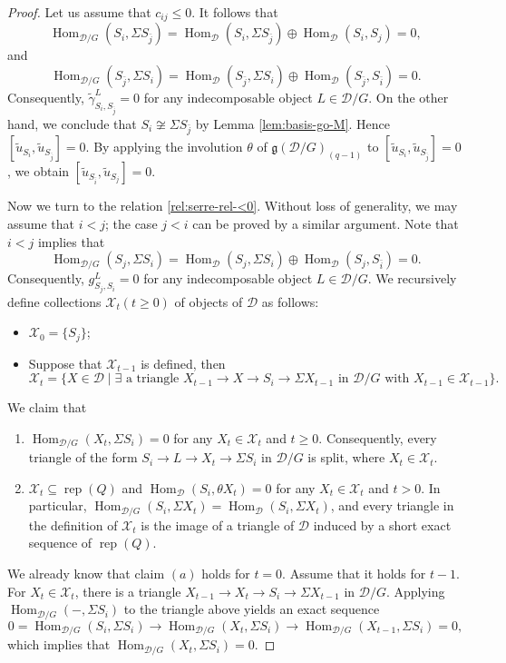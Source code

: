 \documentclass[12pt,reqno]{amsart}
\numberwithin{equation}{section}
\newcommand{\rep}{\operatorname{rep}\nolimits}
\newcommand{\Hom}{\operatorname{Hom}\nolimits}
\begin{document}
	\begin{proof}
		Let us assume that $c_{ij}\leq 0$. It follows that
		\[
		\Hom_{\mathcal{D}/G}(S_i,\Sigma S_{\bar{j}})=\Hom_{\mathcal{D}}(S_i,\Sigma S_{\bar{j}})\oplus \Hom_{\mathcal{D}}(S_i,S_j)=0,
		\]
		and 
		\[
		\Hom_{\mathcal{D}/G}(S_{\bar{j}},\Sigma S_{i})=\Hom_{\mathcal{D}}(S_{\bar{j}},\Sigma S_{i})\oplus \Hom_{\mathcal{D}}(S_{\bar{j}},S_{\bar{i}})=0.
		\]
		Consequently, $\tilde{\gamma}_{S_i,S_{\bar{j}}}^L=0$ for any indecomposable object $L\in \mathcal{D}/G$. On the other hand, we conclude that $S_i\not\cong \Sigma S_{\bar{j}}$ by Lemma \ref{lem:basis-go-M}. Hence $[\tilde{u}_{S_i},\tilde{u}_{S_{\bar{j}}}]=0$. By applying the involution $\theta$ of $\mathfrak{g}(\mathcal{D}/G)_{(q-1)}$ to $[\tilde{u}_{S_i},\tilde{u}_{S_{\bar{j}}}]=0$, we obtain $[\tilde{u}_{S_{\bar{i}}},\tilde{u}_{S_j}]=0$. 
		
		Now we turn to the relation \eqref{rel:serre-rel-<0}. Without loss of generality, we may assume that $i<j$; the case $j<i$ can be proved by a similar argument. Note that $i<j$ implies that \[\Hom_{\mathcal{D}/G}(S_j,\Sigma S_i)=\Hom_{\mathcal{D}}(S_j,\Sigma S_i)\oplus \Hom_{\mathcal{D}}(S_j,S_{\bar{i}})=0.\]
		Consequently, $g_{S_j,S_i}^L=0$ for any indecomposable object $L\in \mathcal{D}/G$. We recursively define collections $\mathcal{X}_t(t\geq 0)$ of objects of $\mathcal{D}$ as follows:
		\begin{itemize}
			\item $\mathcal{X}_0=\{S_j\}$;
			\item Suppose that $\mathcal{X}_{t-1}$ is defined, then 
			\[
			\mathcal{X}_t=\{X\in \mathcal{D}\mid \text{$\exists$ a triangle $X_{t-1}\rightarrow X\rightarrow S_i\rightarrow \Sigma X_{t-1}$ in $\mathcal{D}/G$ with $X_{t-1}\in \mathcal{X}_{t-1}$}\}.
			\]
		\end{itemize}
		We claim that
		\begin{enumerate}
			\item[(a)] $\Hom_{\mathcal{D}/G}(X_t,\Sigma S_i)=0$ for any $X_t\in \mathcal{X}_t$ and $t\geq 0$. Consequently, every triangle of the form $S_i\rightarrow L\rightarrow X_t\rightarrow \Sigma S_i$ in $\mathcal{D}/G$ is split, where $X_t\in \mathcal{X}_t$.
			\item[(b)] $\mathcal{X}_t\subseteq \rep(Q)$ and $\Hom_{\mathcal{D}}(S_i,\theta X_{t})=0$ for any $X_{t}\in \mathcal{X}_{t}$ and $t> 0$. In particular, $\Hom_{\mathcal{D}/G}(S_i,\Sigma X_t)=\Hom_{\mathcal{D}}(S_i,\Sigma X_t)$,  and every triangle in the definition of $\mathcal{X}_t$ is the image of a triangle of $\mathcal{D}$ induced by a short exact sequence of $\rep(Q)$.
		\end{enumerate}
		We already know that claim $(a)$ holds for $t=0$. Assume that it holds for $t-1$.  For $X_t\in \mathcal{X}_t$, there is a triangle $X_{t-1}\rightarrow X_t\rightarrow S_i\rightarrow \Sigma X_{t-1}$ in $\mathcal{D}/G$. Applying $\Hom_{\mathcal{D}/G}(-,\Sigma S_i)$ to the triangle above yields an exact sequence
		\[
		0=\Hom_{\mathcal{D}/G}(S_i,\Sigma S_i)\rightarrow \Hom_{\mathcal{D}/G}(X_t,\Sigma S_i)\rightarrow \Hom_{\mathcal{D}/G}(X_{t-1},\Sigma S_i)=0,
		\]
		which implies that $\Hom_{\mathcal{D}/G}(X_t,\Sigma S_i)=0$.
		

\end{proof}
\end{document}
